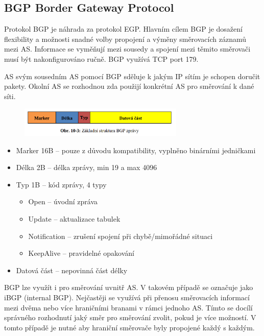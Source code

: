 \subsection{BGP Border Gateway Protocol}

Protokol BGP je náhrada za protokol EGP.
Hlavním cílem BGP je dosažení flexibility a možnosti snadné volby propojení a výměny směrovacích záznamů mezi AS.
Informace se vyměňují mezi sousedy a spojení mezi těmito směrovači musí být nakonfigurováno ručně.
BGP využívá TCP port 179.

AS svým sousedním AS pomocí BGP sděluje k jakým IP sítím je schopen doručit pakety.
Okolní AS se rozhodnou zda použijí konkrétní AS pro směrování k dané síti.

\begin{figure}[!h]
    \centering
    \includegraphics[width=0.7\textwidth]{obrazky/091.png}
\end{figure}

\begin{itemize}[noitemsep]
    \item Marker 16B -- pouze z důvodu kompatibility, vyplněno binárními jedničkami
    \item Délka 2B -- délka zprávy, min 19 a max 4096
    \item Typ 1B -- kód zprávy, 4 typy
    \begin{itemize}[noitemsep]
        \item Open -- úvodní zpráva
        \item Update -- aktualizace tabulek
        \item Notification -- zrušení spojení při chybě/mimořádné situaci
        \item KeepAlive -- pravidelné opakování
    \end{itemize}
    \item Datová část -- nepovinná část délky
\end{itemize}



BGP lze využít i pro směrování uvnitř AS.
V takovém případě se označuje jako iBGP (internal BGP).
Nejčastěji se využívá při přenosu směrovacích informací mezi dvěma nebo více hraničními branami v rámci jednoho AS.
Tímto se docílí správného rozhodnutí jaký směr pro směrování zvolit, pokud je více možností.
V tomto případě je nutné aby hraniční směrovače byly propojené každý s každým.

